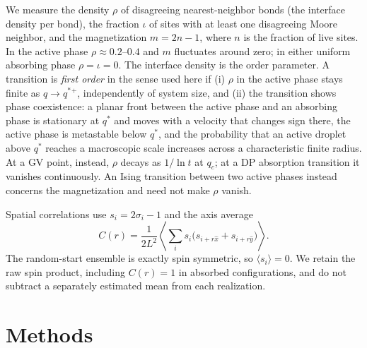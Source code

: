 \documentclass[pre,twocolumn,superscriptaddress,showpacs,floatfix]{revtex4-2}
\newcommand{\qs}{q^{*}}
\begin{document}
We measure the density $\rho$ of disagreeing nearest-neighbor bonds (the interface density per
bond), the fraction $\iota$ of sites with at least one disagreeing Moore neighbor, and the
magnetization $m = 2n-1$, where $n$ is the fraction of live sites. In the active phase
$\rho\approx 0.2$--$0.4$ and $m$ fluctuates around zero; in either uniform
absorbing phase $\rho = \iota = 0$.
The interface density is the order parameter. A transition is \emph{first order} in the sense
used here if (i) $\rho$ in the active phase stays finite as $q\to\qs{}^+$, independently of
system size, and (ii) the transition shows phase coexistence: a planar front between the active
phase and an absorbing phase is stationary at $\qs$ and moves with a velocity that changes sign
there, the active phase is metastable below $\qs$, and the probability
that an active droplet above $\qs$ reaches a macroscopic scale increases across
a characteristic finite radius.
At a GV point, instead, $\rho$ decays as $1/\ln t$ at
$q_c$; at a DP absorption transition it vanishes continuously. An Ising transition between two active phases instead concerns the magnetization and need not make $\rho$ vanish.

Spatial correlations use $s_i=2\sigma_i-1$ and the axis average
\begin{equation}
C(r)=\frac{1}{2L^2}\left\langle\sum_i s_i
\bigl(s_{i+r\hat x}+s_{i+r\hat y}\bigr)\right\rangle.
\label{eq:correlation}
\end{equation}
The random-start ensemble is exactly spin symmetric, so $\langle s_i\rangle=0$.
We retain the raw spin product, including $C(r)=1$ in absorbed configurations,
and do not subtract a separately estimated mean from each realization.

\section{Methods}
\label{sec:methods}
\end{document}
